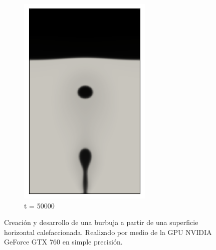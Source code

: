 \begin{figure}[H]
\begin{subfigure}{0.25\textwidth}
		\includegraphics[width=\linewidth]{figs/cap4/cuda_bb_760_s50}
		\caption{t = 50000}
		\label{fig:9}
	\end{subfigure}
	\caption{Creación y desarrollo de una burbuja a partir de una superficie horizontal calefaccionada. Realizado por medio de la GPU NVIDIA GeForce GTX 760 en simple precisión. }
	\label{fig:burbujas_760_simple_cuda}
\end{figure}

\newpage

\newpage

